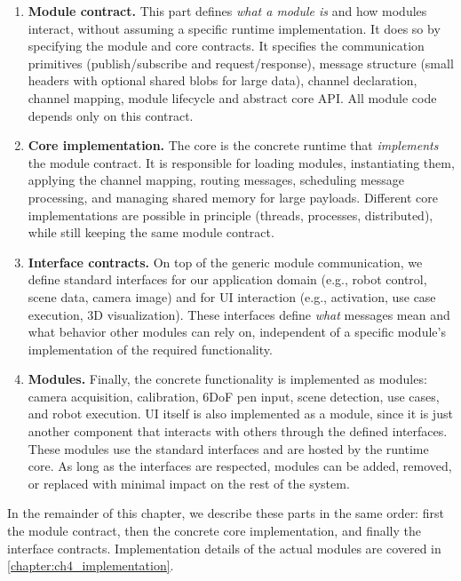 \begin{enumerate}[label=(\arabic*), itemsep=0.3em]
    \item \textbf{Module contract.}
    This part defines \emph{what a module is} and how modules interact, without assuming a specific runtime implementation. It does so by specifying the module and core contracts.
    It specifies the communication primitives (publish/subscribe and request/response), message structure (small headers with optional shared blobs for large data), channel declaration, channel mapping, module lifecycle and abstract core API.
    All module code depends only on this contract.

    \item \textbf{Core implementation.}
    The core is the concrete runtime that \emph{implements} the module contract.
    It is responsible for loading modules, instantiating them, applying the channel mapping, routing messages, scheduling message processing, and managing shared memory for large payloads.
    Different core implementations are possible in principle (threads, processes, distributed), while still keeping the same module contract.

    \item \textbf{Interface contracts.}
    On top of the generic module communication, we define standard interfaces for our application domain (e.g., robot control, scene data, camera image) and for UI interaction (e.g., activation, use case execution, 3D visualization). These interfaces define \emph{what} messages mean and what behavior other modules can rely on, independent of a specific module's implementation of the required functionality.

    \item \textbf{Modules.}
    Finally, the concrete functionality is implemented as modules: camera acquisition, calibration, 6DoF pen input, scene detection, use cases, and robot execution. UI itself is also implemented as a module, since it is just another component that interacts with others through the defined interfaces.
    These modules use the standard interfaces and are hosted by the runtime core.
    As long as the interfaces are respected, modules can be added, removed, or replaced with minimal impact on the rest of the system.
\end{enumerate}

In the remainder of this chapter, we describe these parts in the same order: first the module contract, then the concrete core implementation, and finally the interface contracts. Implementation details of the actual modules are covered in \autoref{chapter:ch4_implementation}.

